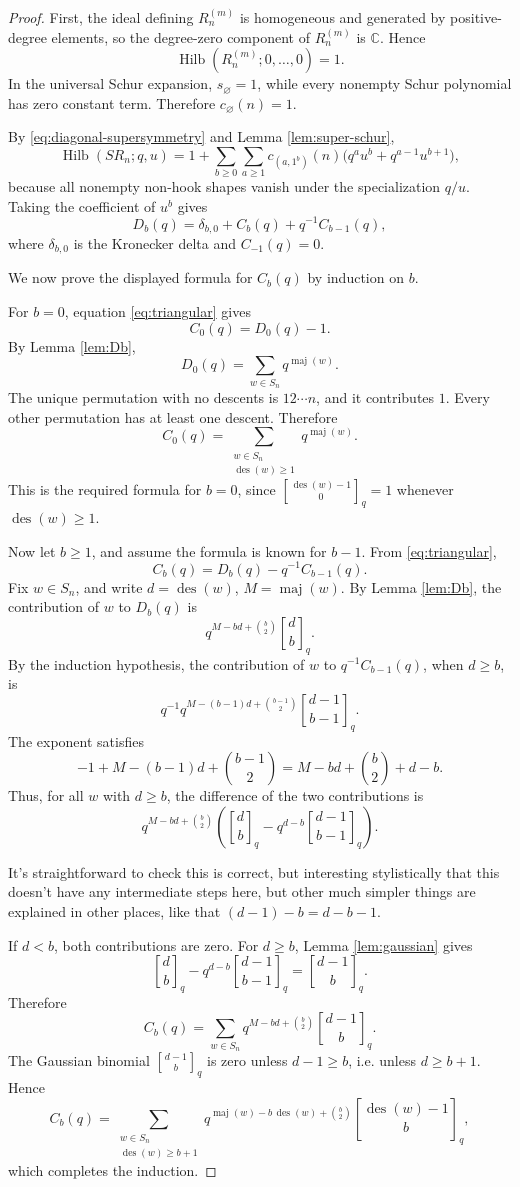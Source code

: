 \documentclass[12pt]{article}
\DeclareMathOperator{\Hilb}{Hilb}
\DeclareMathOperator{\des}{des}
\DeclareMathOperator{\maj}{maj}
\newcommand{\qbinom}[2]{\genfrac{[}{]}{0pt}{}{#1}{#2}_q}
\newcommand{\review}[1]{\begin{reviewbox}#1\end{reviewbox}}
\begin{document}
\begin{proof}
First, the ideal defining \(R_n^{(m)}\) is homogeneous and generated by positive-degree elements, so the degree-zero component of \(R_n^{(m)}\) is \(\mathbb C\).  Hence
\[
\Hilb(R_n^{(m)};0,\ldots,0)=1.
\]
In the universal Schur expansion, \(s_{\varnothing}=1\), while every nonempty Schur polynomial has zero constant term.  Therefore \(c_{\varnothing}(n)=1\).

By \eqref{eq:diagonal-supersymmetry} and Lemma \ref{lem:super-schur},
\[
\Hilb(SR_n;q,u)
=
1+
\sum_{b\ge 0}\sum_{a\ge 1}
c_{(a,1^b)}(n)\bigl(q^a u^b+q^{a-1}u^{b+1}\bigr),
\]
because all nonempty non-hook shapes vanish under the specialization \(q/u\).  Taking the coefficient of \(u^b\) gives
\begin{equation}\label{eq:triangular}
D_b(q)
=
\delta_{b,0}+C_b(q)+q^{-1}C_{b-1}(q),
\end{equation}
where \(\delta_{b,0}\) is the Kronecker delta and \(C_{-1}(q)=0\).

We now prove the displayed formula for \(C_b(q)\) by induction on \(b\).

For \(b=0\), equation \eqref{eq:triangular} gives
\[
C_0(q)=D_0(q)-1.
\]
By Lemma \ref{lem:Db},
\[
D_0(q)=\sum_{w\in S_n}q^{\maj(w)}.
\]
The unique permutation with no descents is \(12\cdots n\), and it contributes \(1\).  Every other permutation has at least one descent.  Therefore
\[
C_0(q)
=
\sum_{\substack{w\in S_n\\ \des(w)\ge 1}}q^{\maj(w)}.
\]
This is the required formula for \(b=0\), since \(\qbinom{\des(w)-1}{0}=1\) whenever \(\des(w)\ge 1\).

Now let \(b\ge 1\), and assume the formula is known for \(b-1\).  From \eqref{eq:triangular},
\[
C_b(q)=D_b(q)-q^{-1}C_{b-1}(q).
\]
Fix \(w\in S_n\), and write \(d=\des(w)\), \(M=\maj(w)\).  By Lemma \ref{lem:Db}, the contribution of \(w\) to \(D_b(q)\) is
\[
q^{M-bd+\binom{b}{2}}\qbinom{d}{b}.
\]
By the induction hypothesis, the contribution of \(w\) to \(q^{-1}C_{b-1}(q)\), when \(d\ge b\), is
\[
q^{-1}
q^{M-(b-1)d+\binom{b-1}{2}}
\qbinom{d-1}{b-1}.
\]
The exponent satisfies
\[
-1+M-(b-1)d+\binom{b-1}{2}
=
M-bd+\binom{b}{2}+d-b.
\]
Thus, for all \(w\) with \(d\ge b\), the difference of the two contributions is
\[
q^{M-bd+\binom{b}{2}}
\left(
\qbinom{d}{b}
-
q^{d-b}\qbinom{d-1}{b-1}
\right).
\] \review{It's straightforward to check this is correct, but interesting stylistically that this doesn't have any intermediate steps here, but other  much simpler things are explained in other places, like that $(d - 1)-b = d- b - 1. $ }
If \(d<b\), both contributions are zero.  For \(d\ge b\), Lemma \ref{lem:gaussian} gives
\[
\qbinom{d}{b}
-
q^{d-b}\qbinom{d-1}{b-1}
=
\qbinom{d-1}{b}.
\]
Therefore
\[
C_b(q)
=
\sum_{w\in S_n}
q^{M-bd+\binom{b}{2}}
\qbinom{d-1}{b}.
\]
The Gaussian binomial \(\qbinom{d-1}{b}\) is zero unless \(d-1\ge b\), i.e. unless \(d\ge b+1\).  Hence
\[
C_b(q)
=
\sum_{\substack{w\in S_n\\ \des(w)\ge b+1}}
q^{\maj(w)-b\,\des(w)+\binom{b}{2}}
\qbinom{\des(w)-1}{b},
\]
which completes the induction.
\end{proof}
\end{document}
